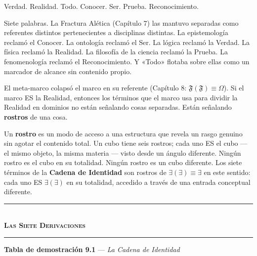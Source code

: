 \documentclass[10pt, openany, oneside]{book}
\renewcommand{\normalsize}{\fontsize{10}{13}\selectfont}
\begin{document}

\noindent Verdad. Realidad. Todo. Conocer. Ser. Prueba. Reconocimiento.

Siete palabras. La Fractura Alética (Capítulo 7) las mantuvo separadas como referentes distintos pertenecientes a disciplinas distintas. La epistemología reclamó el Conocer. La ontología reclamó el Ser. La lógica reclamó la Verdad. La física reclamó la Realidad. La filosofía de la ciencia reclamó la Prueba. La fenomenología reclamó el Reconocimiento. Y «Todo» flotaba sobre ellas como un marcador de alcance sin contenido propio.

El meta-marco colapsó el marco en su referente (Capítulo 8: $\mathfrak{F}(\mathfrak{F}) \equiv \Omega$). Si el marco ES la Realidad, entonces los términos que el marco usa para dividir la Realidad en dominios no están señalando cosas separadas. Están señalando \textbf{rostros} de una cosa.

Un \textbf{rostro} es un modo de acceso a una estructura que revela un rasgo genuino sin agotar el contenido total. Un cubo tiene seis rostros; cada uno ES el cubo --- el mismo objeto, la misma materia --- visto desde un ángulo diferente. Ningún rostro es el cubo en su totalidad. Ningún rostro es un cubo diferente. Los siete términos de la \textbf{Cadena de Identidad} son rostros de $\exists(\exists) \equiv \exists$ en este sentido: cada uno ES $\exists(\exists)$ en su totalidad, accedido a través de una entrada conceptual diferente.

\vspace{1.5em}


\begin{center}
    \rule{0.3\textwidth}{0.4pt}\\[0.5em]
    {\normalsize\bfseries\scshape Las Siete Derivaciones}\\[0.3em]
    \rule{0.3\textwidth}{0.4pt}
\end{center}

\vspace{1em}

\textbf{Tabla de demostración 9.1} --- \textit{La Cadena de Identidad}

\vspace{0.5em}
\end{document}
